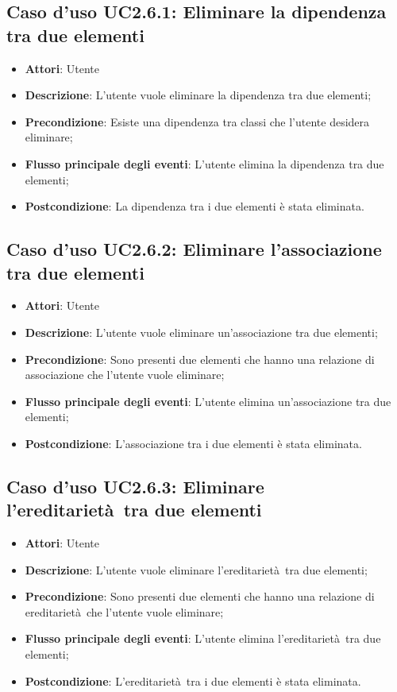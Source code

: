 \documentclass[../AnalisiDeiRequisiti.tex]{subfiles}
\begin{document}
		\subsection{Caso d'uso UC2.6.1: Eliminare la dipendenza tra due elementi }
		\begin{itemize}
			\item \textbf{Attori}: Utente
			\item \textbf{Descrizione}: L'utente vuole eliminare la dipendenza tra due elementi;
			\item \textbf{Precondizione}: Esiste una dipendenza tra classi che l'utente desidera eliminare;
			\item \textbf{Flusso principale degli eventi}: L'utente elimina la dipendenza tra due elementi;
			\item \textbf{Postcondizione}: La dipendenza tra i due elementi è stata eliminata.
		\end{itemize}
		\subsection{Caso d'uso UC2.6.2: Eliminare l'associazione tra due elementi}
		\begin{itemize}
			\item \textbf{Attori}: Utente
			\item \textbf{Descrizione}: L'utente vuole eliminare un'associazione tra due elementi;
			\item \textbf{Precondizione}: Sono presenti due elementi che hanno una relazione di associazione che l'utente vuole eliminare;
			\item \textbf{Flusso principale degli eventi}: L'utente elimina un'associazione tra due elementi;
			\item \textbf{Postcondizione}: L'associazione tra i due elementi è stata eliminata.
		\end{itemize}
		\subsection{Caso d'uso UC2.6.3: Eliminare l'ereditarietà tra due elementi}
		\begin{itemize}
			\item \textbf{Attori}: Utente
			\item \textbf{Descrizione}: L'utente vuole eliminare l'ereditarietà tra due elementi;
			\item \textbf{Precondizione}: Sono presenti due elementi che hanno una relazione di ereditarietà che l'utente vuole eliminare;
			\item \textbf{Flusso principale degli eventi}: L'utente elimina l'ereditarietà tra due elementi;
			\item \textbf{Postcondizione}: L'ereditarietà tra i due elementi è stata eliminata.
		\end{itemize}
\end{document}

